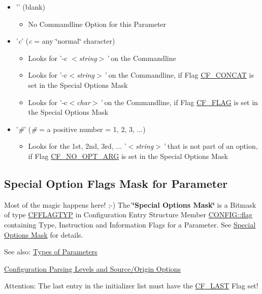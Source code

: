 \begin{itemize}
\item '{\em  \/}' (blank)\begin{itemize}
\item No Commandline Option for this Parameter\end{itemize}
\end{itemize}
\begin{itemize}
\item '{\em c\/}' ({\em c\/} = any \char`\"{}normal\char`\"{} character)\begin{itemize}
\item Looks for '-c $<${\em string$>$'\/} on the Commandline\item Looks for '-c$<${\em string$>$'\/} on the Commandline, if Flag \hyperlink{group__special__options__mask_g9e526dae88bf6803772107ff283637b5}{CF\_\-CONCAT} is set in the Special Options Mask\item Looks for '-c$<${\em char$>$'\/} on the Commandline, if Flag \hyperlink{group__special__options__mask_g1d1f1d1b6eac6b5d9970102318ab2667}{CF\_\-FLAG} is set in the Special Options Mask\end{itemize}
\end{itemize}
\begin{itemize}
\item '{\em \#\/}' ({\em \#\/} = a positive number = 1, 2, 3, ...)\begin{itemize}
\item Looks for the 1st, 2nd, 3rd, ... '$<${\em string$>$'\/} that is not part of an option, if Flag \hyperlink{group__special__options__mask_g97d17b070dac10c14d3930c58bfba76f}{CF\_\-NO\_\-OPT\_\-ARG} is set in the Special Options Mask\end{itemize}
\end{itemize}
\hypertarget{config_initializer_parameter_flagmask}{}\subsection{Special Option Flags Mask for Parameter}\label{config_initializer_parameter_flagmask}
Most of the magic happens here! ;-) The {\bf \char`\"{}Special Options Mask\char`\"{}} is a Bitmask of type \hyperlink{group__special__options__mask_g4854f1596d5c6e0604a478fa9a2e23f0}{CFFLAGTYP} in Configuration Entry Structure Member \hyperlink{struct_c_o_n_f_i_g_b04d08abdf758c0400caaded716f4089}{CONFIG::flag} containing Type, Instruction and Information Flags for a Parameter.  See \hyperlink{group__special__options__mask}{Special Options Mask} for details.

\begin{Desc}
\item[See also:]\hyperlink{parameter_types}{Types of Parameters} 

\hyperlink{config_levels}{Configuration Parsing Levels and Source/Origin Options}\end{Desc}
\begin{Desc}
\item[Attention:]The last entry in the initializer list must have the \hyperlink{group__special__options__mask_ga4d82cea91ede4aee78594417894e368}{CF\_\-LAST} Flag set! \end{Desc}
